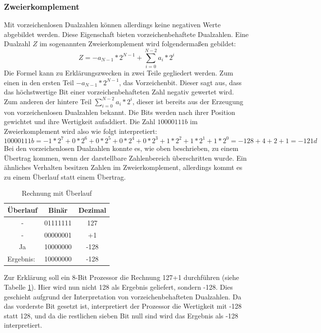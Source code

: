 \documentclass[12pt]{article}
\begin{document}
\subsubsection{Zweierkomplement}
\noindent Mit vorzeichenlosen Dualzahlen können allerdings keine negativen Werte abgebildet werden. Diese Eigenschaft bieten vorzeichenbehaftete Dualzahlen. Eine Dualzahl $Z$ im sogenannten Zweierkomplement wird folgendermaßen gebildet:
$$Z=-a_{N-1}*2^{N-1}+\sum\limits_{i=0}^{N-2} a_i * 2^i$$
Die Formel kann zu Erklärungszwecken in zwei Teile gegliedert werden. Zum einen in den ersten Teil $-a_{N-1}*2^{N-1}$, das Vorzeichenbit. Dieser sagt aus, dass das höchstwertige Bit einer vorzeichenbehafteten Zahl negativ gewertet wird. Zum anderen der hintere Teil $\sum\limits_{i=0}^{N-2} a_i * 2^i$, dieser ist bereits aus der Erzeugung von vorzeichenlosen Dualzahlen bekannt. Die Bits werden nach ihrer Position gewichtet und ihre Wertigkeit aufaddiert. Die Zahl $10000111b$ im Zweierkomplement wird also wie folgt interpretiert:
$$10000111b = -1*2^7+0*2^6+0*2^5+0*2^4+0*2^3+1*2^2+1*2^1+1*2^0 = -128+4+2+1 = -121d$$
Bei den vorzeichenlosen Dualzahlen konnte es, wie oben beschrieben, zu einem Übertrag kommen, wenn der darstellbare Zahlenbereich überschritten wurde. Ein ähnliches Verhalten besitzen Zahlen im Zweierkomplement, allerdings kommt es zu einem Überlauf statt einem Übertrag. 


\begin{table}[!htb]
\centering
\begin{tabular}{|c|c|c|}
\hline
\textbf{Überlauf}               & \multicolumn{1}{c|}{\textbf{Binär}} & \multicolumn{1}{c|}{\textbf{Dezimal}} \\ \hline
-                               & 01111111                            & 127                                   \\ \hline
-                               & 00000001                            & +1                                    \\ \hline
Ja                              & 10000000                            & -128                                  \\ \hline\hline
\multicolumn{1}{|l|}{Ergebnis:} & 10000000                            & -128                                  \\ \hline
\end{tabular}
\caption{Rechnung mit Überlauf}
\label{tab:ueberlauf}
\end{table}

\noindent Zur Erklärung soll ein 8-Bit Prozessor die Rechnung 127+1 durchführen (siehe Tabelle \ref{tab:ueberlauf}). Hier wird nun nicht 128 als Ergebnis geliefert, sondern -128. Dies geschieht aufgrund der Interpretation von vorzeichenbehafteten Dualzahlen. Da das vorderste Bit  gesetzt ist, interpretiert der Prozessor die Wertigkeit mit -128 statt 128, und da die restlichen sieben Bit null sind wird das Ergebnis als -128 interpretiert.
\end{document}
